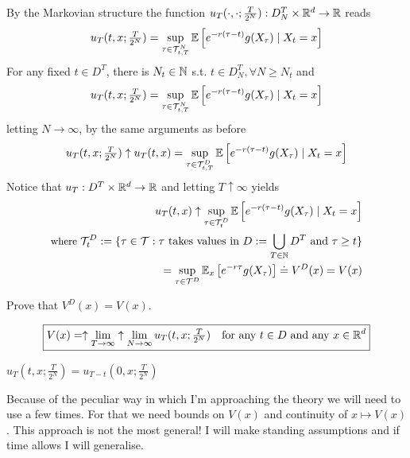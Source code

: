 By the Markovian structure the function $u_T(\cdot, \cdot; \frac{T}{2^N}) : D_N^T \times \mathbb R^d \to \mathbb R$ reads
\begin{equation*}
    u_T(t, x; \tfrac{T}{2^N}) = \sup_{\tau \in \mathcal{T}_{t,T}^N} \mathbb E \left[ e^{-r(\tau - t)} g(X_\tau) \mid X_t = x \right]
\end{equation*}
For any fixed $t \in D^T$, there is $N_t \in \mathbb N$ s.t. $t \in D_N^T, \forall N \geq N_t$ and
\begin{equation*}
    u_T(t, x; \tfrac{T}{2^N}) = \sup_{\tau \in \mathcal{T}_{t,T}^N} \mathbb E \left[ e^{-r(\tau - t)} g(X_\tau) \mid X_t = x \right]
\end{equation*}
letting $N \to \infty$, by the same arguments as before
\begin{equation*}
    u_T(t, x; \tfrac{T}{2^N}) \uparrow u_T(t, x) = \sup_{\tau \in \mathcal{T}_{t,T}^D} \mathbb E \left[ e^{-r(\tau - t)} g(X_\tau) \mid X_t = x \right]
\end{equation*}
Notice that $u_T : D^T \times \mathbb R^d \to \mathbb R$ and letting $T \uparrow \infty$ yields
\begin{align*}
    u_T(t, x) \uparrow \sup_{\tau \in \mathcal{T}_t^D} \mathbb E \left[ e^{-r(\tau - t)} g(X_\tau) \mid X_t = x \right] \\
    \text{\small where } \mathcal{T}_t^D := \{ \tau \in \mathcal{T} : \tau \text{ takes values in } D := \bigcup_{T \in \mathbb N} D^T \text{ and } \tau \geq t \} \\
    = \sup_{\tau \in \mathcal{T}^D} \mathbb E_x \left[ e^{-r\tau} g(X_\tau) \right] \doteq V^D(x) = V(x)
\end{align*}
\begin{homework}
    Prove that $V^D(x) = V(x)$.
\end{homework}

\begin{remark*}[In summary]
    \begin{equation*}
        \boxed{V(x) = \uparrow \lim_{T \to \infty} \uparrow \lim_{N \to \infty} u_T(t, x; \tfrac{T}{2^N}) \quad \text{for any } t \in D \text{ and any } x \in \mathbb R^d}
    \end{equation*}
\end{remark*}

\begin{remark}
    $u_T(t, x; \frac{T}{2^N}) = u_{T-t}(0, x; \frac{T}{2^N})$
\end{remark}

\begin{remark}
    Because of the peculiar way in which I'm approaching the theory we will need to use  a few times. For that we need bounds on $V(x)$ and continuity of $x \mapsto V(x)$. This approach is not the most general! I will make standing assumptions and if time allows I will generalise.
\end{remark}

